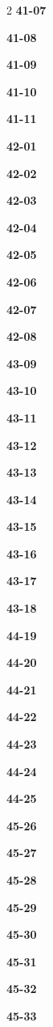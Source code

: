 \documentclass[10pt,a4paper]{article}
\begin{document}
\begin{multicols}{2}
\noindent\textbf{41-07}\ \par
\noindent\textbf{41-08}\ \par
\noindent\textbf{41-09}\ \par
\noindent\textbf{41-10}\ \par
\noindent\textbf{41-11}\ \par
\noindent\textbf{42-01}\ \par
\noindent\textbf{42-02}\ \par
\noindent\textbf{42-03}\ \par
\noindent\textbf{42-04}\ \par
\noindent\textbf{42-05}\ \par
\noindent\textbf{42-06}\ \par
\noindent\textbf{42-07}\ \par
\noindent\textbf{42-08}\ \par
\noindent\textbf{43-09}\ \par
\noindent\textbf{43-10}\ \par
\noindent\textbf{43-11}\ \par
\noindent\textbf{43-12}\ \par
\noindent\textbf{43-13}\ \par
\noindent\textbf{43-14}\ \par
\noindent\textbf{43-15}\ \par
\noindent\textbf{43-16}\ \par
\noindent\textbf{43-17}\ \par
\noindent\textbf{43-18}\ \par
\noindent\textbf{44-19}\ \par
\noindent\textbf{44-20}\ \par
\noindent\textbf{44-21}\ \par
\noindent\textbf{44-22}\ \par
\noindent\textbf{44-23}\ \par
\noindent\textbf{44-24}\ \par
\noindent\textbf{44-25}\ \par
\noindent\textbf{45-26}\ \par
\noindent\textbf{45-27}\ \par
\noindent\textbf{45-28}\ \par
\noindent\textbf{45-29}\ \par
\noindent\textbf{45-30}\ \par
\noindent\textbf{45-31}\ \par
\noindent\textbf{45-32}\ \par
\noindent\textbf{45-33}\ \par

\end{multicols}
\end{document}
